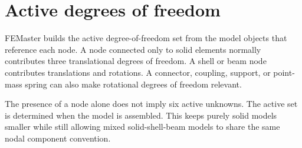 \section{Active degrees of freedom}

FEMaster builds the active degree-of-freedom set from the model objects that reference each node. A node connected only to solid elements normally contributes three translational degrees of freedom. A shell or beam node contributes translations and rotations. A connector, coupling, support, or point-mass spring can also make rotational degrees of freedom relevant.

The presence of a node alone does not imply six active unknowns. The active set is determined when the model is assembled. This keeps purely solid models smaller while still allowing mixed solid-shell-beam models to share the same nodal component convention.
